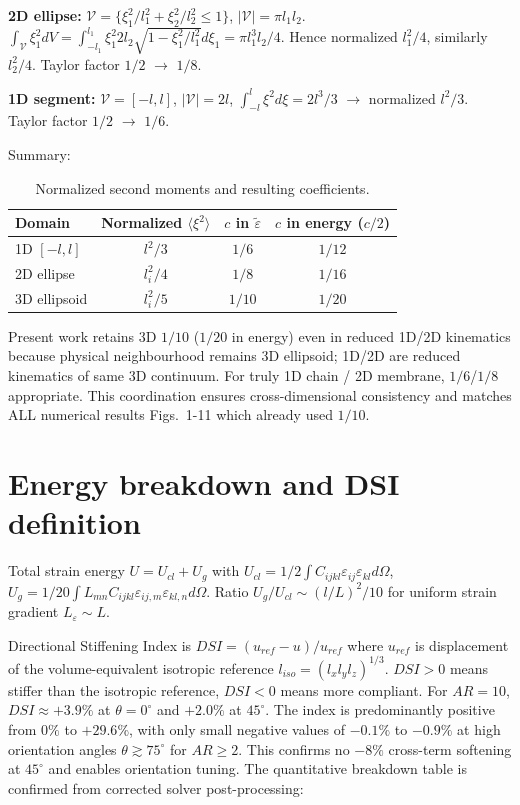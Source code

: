 \documentclass[final,3p,times,fleqn]{elsarticle}
\newcommand{\rev}[1]{\textcolor{revcolor}{#1}}
\begin{document}
\rev{\textbf{2D ellipse:} $\mathcal{V}=\{\xi_1^2/l_1^2+\xi_2^2/l_2^2\le1\}$, $|\mathcal{V}|=\pi l_1l_2$. $\int_{\mathcal{V}} \xi_1^2 dV = \int_{-l_1}^{l_1} \xi_1^2 2 l_2\sqrt{1-\xi_1^2/l_1^2} d\xi_1 = \pi l_1^3 l_2/4$. Hence normalized $l_1^2/4$, similarly $l_2^2/4$. Taylor factor $1/2$ $\rightarrow$ $1/8$.}

\rev{\textbf{1D segment:} $\mathcal{V}=[-l,l]$, $|\mathcal{V}|=2l$, $\int_{-l}^{l}\xi^2 d\xi =2l^3/3$ $\rightarrow$ normalized $l^2/3$. Taylor factor $1/2$ $\rightarrow$ $1/6$.}

\rev{Summary:}
\begin{table}[h]
\centering
\caption{\rev{Normalized second moments and resulting coefficients.}}
\label{tab:coeffs}
\begin{tabular}{lccc}
\hline
Domain & Normalized $\langle\xi^2\rangle$ & $c$ in $\tilde{\varepsilon}$ & $c$ in energy ($c/2$) \\
\hline
1D $[-l,l]$ & $l^2/3$ & $1/6$ & $1/12$ \\
2D ellipse & $l_i^2/4$ & $1/8$ & $1/16$ \\
3D ellipsoid & $l_i^2/5$ & $1/10$ & $1/20$ \\
\hline
\end{tabular}
\end{table}

\rev{Present work retains 3D $1/10$ ($1/20$ in energy) even in reduced 1D/2D kinematics because physical neighbourhood remains 3D ellipsoid; 1D/2D are reduced kinematics of same 3D continuum. For truly 1D chain / 2D membrane, $1/6$/$1/8$ appropriate. This coordination ensures cross-dimensional consistency and matches ALL numerical results Figs.~1-11 which already used $1/10$.}

\section{Energy breakdown and DSI definition}
\label{app:energy}
\rev{Total strain energy $U=U_{cl}+U_{g}$ with $U_{cl}=1/2\int C_{ijkl}\varepsilon_{ij}\varepsilon_{kl}d\Omega$, $U_g=1/20\int L_{mn}C_{ijkl}\varepsilon_{ij,m}\varepsilon_{kl,n}d\Omega$. Ratio $U_g/U_{cl}\sim (l/L)^2/10$ for uniform strain gradient $L_\varepsilon\sim L$.}

\rev{Directional Stiffening Index is $DSI=(u_{ref}-u)/u_{ref}$ where $u_{ref}$ is displacement of the volume-equivalent isotropic reference $l_{iso}=(l_xl_yl_z)^{1/3}$. $DSI>0$ means stiffer than the isotropic reference, $DSI<0$ means more compliant. For $AR=10$, $DSI\approx+3.9\%$ at $\theta=0^\circ$ and $+2.0\%$ at $45^\circ$. The index is predominantly positive from $0\%$ to $+29.6\%$, with only small negative values of $-0.1\%$ to $-0.9\%$ at high orientation angles $\theta\gtrsim75^\circ$ for $AR\ge2$. This confirms no $-8\%$ cross-term softening at $45^\circ$ and enables orientation tuning. The quantitative breakdown table is confirmed from corrected solver post-processing:}
\end{document}
